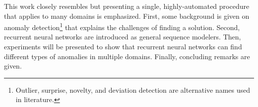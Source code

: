 This work closely resembles \cite{Malhotra2015} but presenting a single, highly-automated procedure that applies to many domains is emphasized. First, some background is given on anomaly detection\footnote{Outlier, surprise, novelty, and deviation detection are alternative names used in literature.} that explains the challenges of finding a solution. Second, recurrent neural networks are introduced as general sequence modelers. Then, experiments will be presented to show that recurrent neural networks can find different types of anomalies in multiple domains. Finally, concluding remarks are given.


